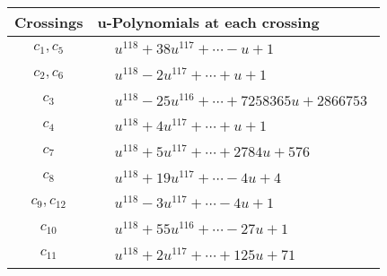 \documentclass[1p]{elsarticle_modified}
\theoremstyle{definition}
\begin{document}
\begin{tabular}{m{50pt}|m{274pt}}
Crossings & \hspace{64pt}u-Polynomials at each crossing \\
\hline $$\begin{aligned}c_{1},c_{5}\end{aligned}$$&$\begin{aligned}
&u^{118}+38 u^{117}+\cdots- u+1
\end{aligned}$\\
\hline $$\begin{aligned}c_{2},c_{6}\end{aligned}$$&$\begin{aligned}
&u^{118}-2 u^{117}+\cdots+u+1
\end{aligned}$\\
\hline $$\begin{aligned}c_{3}\end{aligned}$$&$\begin{aligned}
&u^{118}-25 u^{116}+\cdots+7258365 u+2866753
\end{aligned}$\\
\hline $$\begin{aligned}c_{4}\end{aligned}$$&$\begin{aligned}
&u^{118}+4 u^{117}+\cdots+u+1
\end{aligned}$\\
\hline $$\begin{aligned}c_{7}\end{aligned}$$&$\begin{aligned}
&u^{118}+5 u^{117}+\cdots+2784 u+576
\end{aligned}$\\
\hline $$\begin{aligned}c_{8}\end{aligned}$$&$\begin{aligned}
&u^{118}+19 u^{117}+\cdots-4 u+4
\end{aligned}$\\
\hline $$\begin{aligned}c_{9},c_{12}\end{aligned}$$&$\begin{aligned}
&u^{118}-3 u^{117}+\cdots-4 u+1
\end{aligned}$\\
\hline $$\begin{aligned}c_{10}\end{aligned}$$&$\begin{aligned}
&u^{118}+55 u^{116}+\cdots-27 u+1
\end{aligned}$\\
\hline $$\begin{aligned}c_{11}\end{aligned}$$&$\begin{aligned}
&u^{118}+2 u^{117}+\cdots+125 u+71
\end{aligned}$\\
\hline
\end{tabular}\\~\\
\end{document}
